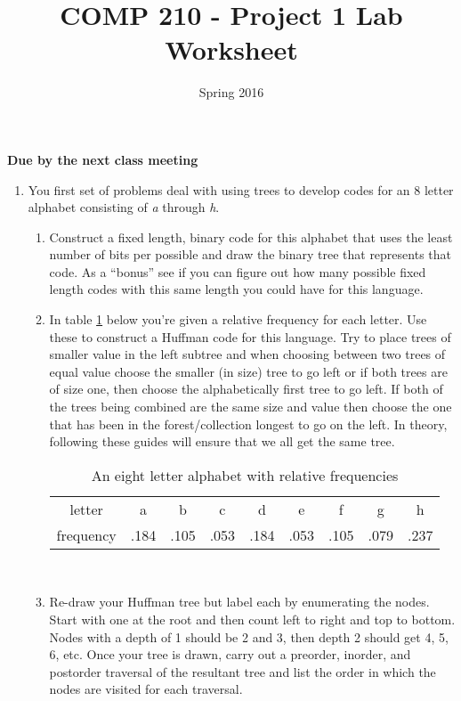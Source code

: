 \documentclass[]{article}
\title{COMP 210 - Project 1 Lab Worksheet}
\author{}
\date{Spring 2016}
\begin{document}
\maketitle
\thispagestyle{empty}

\begin{center}
\textbf{Due by the next class meeting}
\end{center}

\begin{enumerate}

\item You first set of problems deal with using trees to develop codes for an 8 letter alphabet consisting of \textit{a} through \textit{h}.
\begin{enumerate}
\item Construct a fixed length, binary code for this alphabet that uses the least number of bits per possible and draw the binary tree that represents that code. As a ``bonus'' see if you can figure out how many possible fixed length codes with this same length you could have for this language.
\newpage \thispagestyle{empty}

\item In table \ref{tab:freq} below you're given a relative frequency for each letter. Use these to construct a Huffman code for this language. Try to place trees of smaller value in the left subtree and when choosing between two trees of equal value choose the smaller (in size) tree to go left or if both trees are of size one, then choose the alphabetically first tree to go left. If both of the trees being combined are the same size and value then choose the one that has been in the forest/collection longest to go on the left. In theory, following these guides will ensure that we all get the same tree. 

\begin{table}[!htpb]
\begin{center}
\begin{tabular}{ccccccccc}
letter    & a & b & c & d &  e & f & g & h \\
frequency & .184 & .105 & .053 & .184 & .053 & .105 & .079 & .237 
\end{tabular}
\end{center}
\caption{An eight letter alphabet with relative frequencies}
\label{tab:freq}
\end{table}

\newpage \thispagestyle{empty}
\mbox{ }
\newpage \thispagestyle{empty}

\item Re-draw your Huffman tree but label each by enumerating the nodes. Start with one at the root and then count left to right and top to bottom. Nodes with a depth of 1 should be 2 and 3, then depth 2 should get 4, 5, 6, etc. Once your tree is drawn, carry out a preorder, inorder, and postorder traversal of the resultant tree and list the order in which the nodes are visited for each traversal. 

\end{enumerate}

\end{enumerate}
\end{document}
